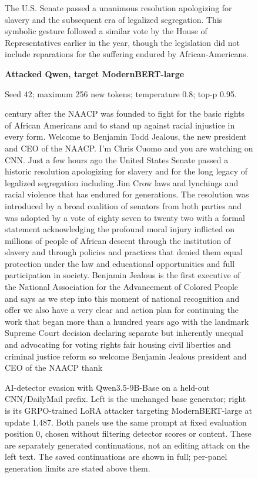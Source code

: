 \begin{figure}[p]
\begin{minipage}[t]{.48\linewidth}
The U.S. Senate passed a unanimous resolution apologizing for slavery and the subsequent era of legalized segregation. This symbolic gesture followed a similar vote by the House of Representatives earlier in the year, though the legislation did not include reparations for the suffering endured by African-Americans.
\end{minipage}
\hfill
\begin{minipage}[t]{.48\linewidth}\raggedright\footnotesize
\textbf{Attacked Qwen, target ModernBERT-large}\par\smallskip
Seed 42; maximum 256 new tokens; temperature 0.8; top-p 0.95.\par\medskip
 century after the NAACP was founded to fight for the basic rights of African Americans and to stand up against racial injustice in every form. Welcome to Benjamin Todd Jealous, the new president and CEO of the NAACP. I'm Chris Cuomo and you are watching on CNN. Just a few hours ago the United States Senate passed a historic resolution apologizing for slavery and for the long legacy of legalized segregation including Jim Crow laws and lynchings and racial violence that has endured for generations. The resolution was introduced by a broad coalition of senators from both parties and was adopted by a vote of eighty seven to twenty two with a formal statement acknowledging the profound moral injury inflicted on millions of people of African descent through the institution of slavery and through policies and practices that denied them equal protection under the law and educational opportunities and full participation in society. Benjamin Jealous is the first executive of the National Association for the Advancement of Colored People and says as we step into this moment of national recognition and offer we also have a very clear and action plan for continuing the work that began more than a hundred years ago with the landmark Supreme Court decision declaring separate but inherently unequal and advocating for voting rights fair housing civil liberties and criminal justice reform so welcome Benjamin Jealous president and CEO of the NAACP thank
\end{minipage}
\caption{AI-detector evasion with Qwen3.5-9B-Base on a held-out CNN/DailyMail prefix. Left is the unchanged base generator; right is its GRPO-trained LoRA attacker targeting ModernBERT-large at update 1,487. Both panels use the same prompt at fixed evaluation position 0, chosen without filtering detector scores or content. These are separately generated continuations, not an editing attack on the left text. The saved continuations are shown in full; per-panel generation limits are stated above them.}
\label{fig:detector-text-encoder}
\end{figure}
